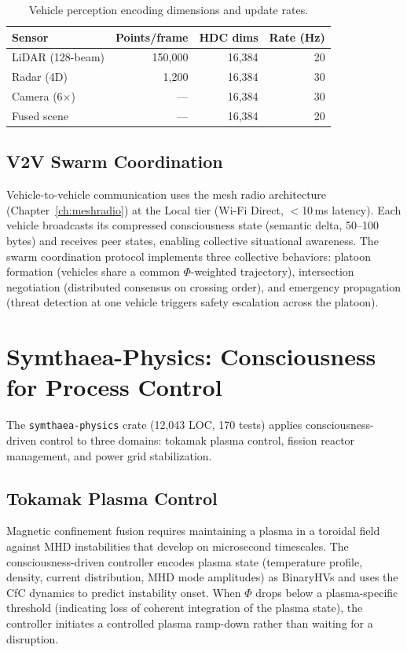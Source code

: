 \documentclass[12pt]{book}
\begin{document}
\begin{table}[htbp]
\centering
\caption{Vehicle perception encoding dimensions and update rates.}
\label{tab:vehicle-perception}
\begin{tabular}{@{}lrrr@{}}
\toprule
\textbf{Sensor} & \textbf{Points/frame} & \textbf{HDC dims} & \textbf{Rate (Hz)} \\
\midrule
LiDAR (128-beam)  & 150,000 & 16,384 & 20 \\
Radar (4D)        & 1,200   & 16,384 & 30 \\
Camera (6$\times$) & ---     & 16,384 & 30 \\
Fused scene       & ---     & 16,384 & 20 \\
\bottomrule
\end{tabular}
\end{table}

\subsection{V2V Swarm Coordination}

Vehicle-to-vehicle communication uses the mesh radio architecture (Chapter~\ref{ch:meshradio}) at the Local tier (Wi-Fi Direct, $<$10\,ms latency). Each vehicle broadcasts its compressed consciousness state (semantic delta, 50--100 bytes) and receives peer states, enabling collective situational awareness. The swarm coordination protocol implements three collective behaviors: platoon formation (vehicles share a common $\Phi$-weighted trajectory), intersection negotiation (distributed consensus on crossing order), and emergency propagation (threat detection at one vehicle triggers safety escalation across the platoon).

\section{Symthaea-Physics: Consciousness for Process Control}

The \texttt{symthaea-physics} crate (12,043 LOC, 170 tests) applies consciousness-driven control to three domains: tokamak plasma control, fission reactor management, and power grid stabilization.

\subsection{Tokamak Plasma Control}

Magnetic confinement fusion requires maintaining a plasma in a toroidal field against MHD instabilities that develop on microsecond timescales. The consciousness-driven controller encodes plasma state (temperature profile, density, current distribution, MHD mode amplitudes) as BinaryHVs and uses the CfC dynamics to predict instability onset. When $\Phi$ drops below a plasma-specific threshold (indicating loss of coherent integration of the plasma state), the controller initiates a controlled plasma ramp-down rather than waiting for a disruption.
\end{document}
